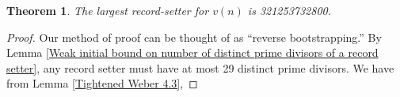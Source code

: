 \documentclass{article}
\newtheorem{theorem}{Theorem}
\begin{document}
\begin{theorem} The largest record-setter for $v(n)$ is 321253732800.
\end{theorem}

\begin{proof} Our method of proof can be thought of as ``reverse bootstrapping.'' By Lemma \ref{Weak initial bound on number of distinct prime divisors of a record setter}, any record setter must have at most 29 distinct prime divisors. We have from Lemma \ref{Tightened Weber 4.3}, 







\end{proof}
\end{document}
